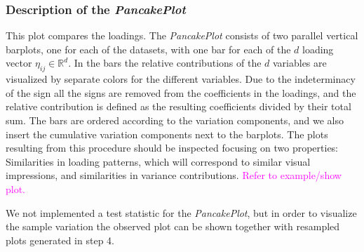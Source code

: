 \documentclass[titlepage,11pt,twoside]{article}
\newcommand{\hl}[1]{\textcolor{magenta}{#1}}
\newcommand{\RR}{\mathbb{R}}
\begin{document}
\subsubsection{Description of the \emph{PancakePlot}}
This plot compares the loadings. The \emph{PancakePlot} consists of two parallel vertical barplots, one for each of the datasets, with one bar for each of the $d$ loading vector $\eta_{ij} \in \RR^d$. In the bars the relative contributions of the $d$ variables are visualized by separate colors for the different variables. Due to the indeterminacy of the sign all the signs are removed from the coefficients in the loadings, and the relative contribution is defined as the resulting coefficients divided by their total sum. The bars are ordered according to the variation components, and we also insert the cumulative variation components next to the barplots. The plots resulting from this procedure should be inspected focusing on two properties: Similarities in loading patterns, which will correspond to similar visual impressions, and similarities in variance contributions.  \hl{Refer to example/show plot.}

We not implemented a test statistic for the \emph{PancakePlot}, but in order to visualize the sample variation the observed plot can be shown together with resampled plots generated in step 4.

\end{document}
